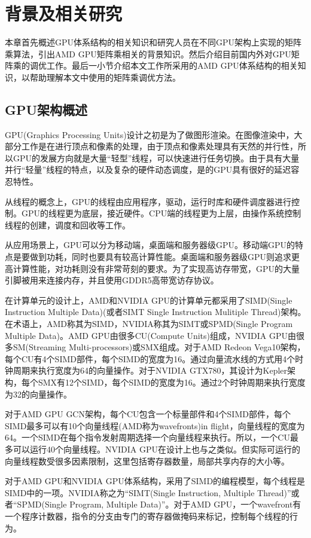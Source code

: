 \chapter{背景及相关研究}\label{chap:background}
本章首先概述GPU体系结构的相关知识和研究人员在不同GPU架构上实现的矩阵乘算法，引出AMD GPU矩阵乘相关的背景知识。然后介绍目前国内外对GPU矩阵乘的调优工作。最后一小节介绍本文工作所采用的AMD GPU体系结构的相关知识，以帮助理解本文中使用的矩阵乘调优方法。

\section{GPU架构概述}

GPU(Graphics Processing Units)设计之初是为了做图形渲染。在图像渲染中，大部分工作是在进行顶点和像素的处理，由于顶点和像素处理具有天然的并行性，所以GPU的发展方向就是大量“轻型”线程，可以快速进行任务切换。由于具有大量并行“轻量”线程的特点，以及复杂的硬件动态调度，是的GPU具有很好的延迟容忍特性。

从线程的概念上，GPU的线程由应用程序，驱动，运行时库和硬件调度器进行控制。GPU的线程更为底层，接近硬件。CPU端的线程更为上层，由操作系统控制线程的创建，调度和回收等工作。

从应用场景上，GPU可以分为移动端，桌面端和服务器级GPU。移动端GPU的特点是要做到功耗，同时也要具有较高计算性能。桌面端和服务器级GPU则追求更高计算性能，对功耗则没有非常苛刻的要求。为了实现高访存带宽，GPU的大量引脚被用来连接内存，并且使用GDDR5高带宽访存协议。

在计算单元的设计上，AMD和NVIDIA GPU的计算单元都采用了SIMD(Single Instruction Multiple Data)(或者SIMT Single Instruction Mulitiple Thread)架构。在术语上，AMD称其为SIMD，NVIDIA称其为SIMT或SPMD(Single Program Multiple Data)。AMD GPU由很多CU(Compute Units)组成，NVIDIA GPU由很多SM(Streaming Multi-processors)或SMX组成。对于AMD Redeon Vega10架构，每个CU有4个SIMD部件，每个SIMD的宽度为16。通过向量流水线的方式用4个时钟周期来执行宽度为64的向量操作。对于NVIDIA GTX780，其设计为Kepler架构，每个SMX有12个SIMD，每个SIMD的宽度为16。通过2个时钟周期来执行宽度为32的向量操作。

对于AMD GPU GCN架构，每个CU包含一个标量部件和4个SIMD部件，每个SIMD最多可以有10个向量线程(AMD称为wavefronts)in flight，向量线程的宽度为64。一个SIMD在每个指令发射周期选择一个向量线程来执行。所以，一个CU最多可以运行40个向量线程。NVIDIA GPU在设计上也与之类似。但实际可运行的向量线程数受很多因素限制，这里包括寄存器数量，局部共享内存的大小等。

对于AMD GPU和NVIDIA GPU体系结构，采用了SIMD的编程模型，每个线程是SIMD中的一项。NVIDIA称之为“SIMT(Single Instruction, Multiple Thread)”或者“SPMD(Single Program, Multiple Data)”。对于AMD GPU，一个wavefront有一个程序计数器，指令的分支由专门的寄存器做掩码来标记，控制每个线程的行为。

